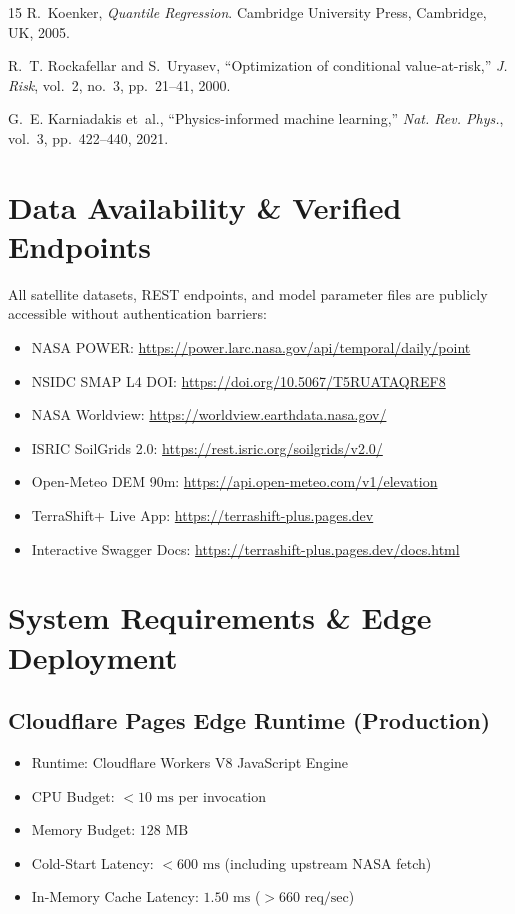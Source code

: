 \documentclass[10pt,twocolumn]{article}
\begin{document}
\begin{thebibliography}{15}
R.~Koenker, \textit{Quantile Regression}. Cambridge University Press, Cambridge, UK, 2005.

R.~T. Rockafellar and S.~Uryasev, ``Optimization of conditional value-at-risk,'' \textit{J. Risk}, vol.~2, no.~3, pp.~21--41, 2000.

G.~E. Karniadakis et~al., ``Physics-informed machine learning,'' \textit{Nat. Rev. Phys.}, vol.~3, pp.~422--440, 2021.
\end{thebibliography}

\appendix
\section{Data Availability \& Verified Endpoints}
All satellite datasets, REST endpoints, and model parameter files are publicly accessible without authentication barriers:
\begin{itemize}[leftmargin=*]
  \item NASA POWER: \url{https://power.larc.nasa.gov/api/temporal/daily/point}
  \item NSIDC SMAP L4 DOI: \url{https://doi.org/10.5067/T5RUATAQREF8}
  \item NASA Worldview: \url{https://worldview.earthdata.nasa.gov/}
  \item ISRIC SoilGrids 2.0: \url{https://rest.isric.org/soilgrids/v2.0/}
  \item Open-Meteo DEM 90m: \url{https://api.open-meteo.com/v1/elevation}
  \item TerraShift+ Live App: \url{https://terrashift-plus.pages.dev}
  \item Interactive Swagger Docs: \url{https://terrashift-plus.pages.dev/docs.html}
\end{itemize}

\section{System Requirements \& Edge Deployment}
\subsection{Cloudflare Pages Edge Runtime (Production)}
\begin{itemize}[leftmargin=*]
  \item Runtime: Cloudflare Workers V8 JavaScript Engine
  \item CPU Budget: $<10\text{ ms}$ per invocation
  \item Memory Budget: $128\text{ MB}$
  \item Cold-Start Latency: $<600\text{ ms}$ (including upstream NASA fetch)
  \item In-Memory Cache Latency: $1.50\text{ ms}$ ($>660\text{ req/sec}$)
\end{itemize}
\end{document}
